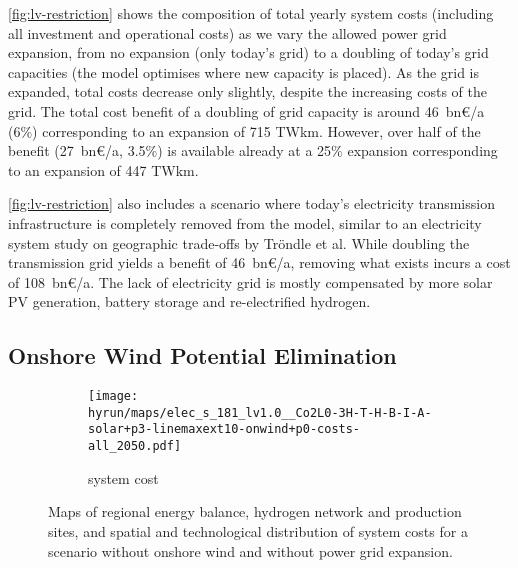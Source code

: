 \cref{fig:lv-restriction} shows the composition of total yearly system costs
(including all investment and operational costs) as we vary the allowed power
grid expansion, from no expansion (only today's grid) to a doubling of today's
grid capacities (the model optimises where new capacity is placed). As the grid
is expanded, total costs decrease only slightly, despite the increasing costs of
the grid. The total cost benefit of a doubling of grid capacity is around
46~bn\euro/a (6\%) corresponding to an expansion of 715 TWkm. However, over half
of the benefit (27~bn\euro/a, 3.5\%) is available already at a 25\% expansion
corresponding to an expansion of 447 TWkm.

\cref{fig:lv-restriction} also includes a scenario where today's electricity
transmission infrastructure is completely removed from the model, similar to an
electricity system study on geographic trade-offs by Tröndle et
al. While doubling the transmission grid
yields a benefit of 46~bn\euro/a, removing what exists incurs a cost of
108~bn\euro/a. The lack of electricity grid is mostly compensated by more solar
PV generation, battery storage and re-electrified hydrogen.

\subsection{Onshore Wind Potential Elimination}
\label{sec:si:onw}

\begin{figure}
    \centering
    \begin{subfigure}[t]{0.6\textwidth}
        \centering
        \caption{system cost}
        \texttt{[image: \\hyrun/maps/elec\_s\_181\_lv1.0\_\_Co2L0-3H-T-H-B-I-A-solar+p3-linemaxext10-onwind+p0-costs-all\_2050.pdf]}
        \label{fig:no-onw:tsc}
    \end{subfigure}
    \caption{Maps of regional energy balance, hydrogen network and production sites, and spatial and technological distribution of system costs for a scenario without onshore wind and without power grid expansion.}
    \label{fig:no-onw}
\end{figure}

